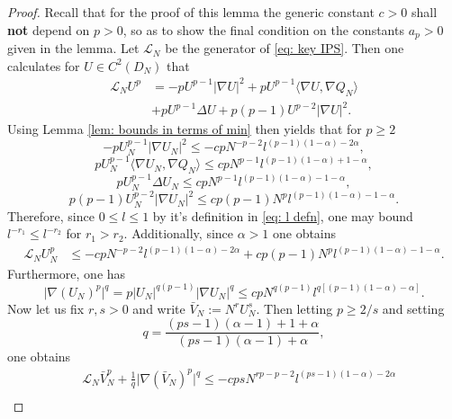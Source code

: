 \documentclass{article}
\begin{document}
\begin{proof}
Recall that for the proof of this lemma the generic constant $c>0$ shall \textbf{not} depend on $p>0$, so as to show the final condition on the constants $a_p>0$ given in the lemma. Let $\mathcal{L}_N$ be the generator of \eqref{eq: key IPS}. Then one calculates for $U\in C^2(D_N)$ that
\begin{align}
    \mathcal{L}_N U^p&=-pU^{p-1}\lvert \nabla U\rvert^2+pU^{p-1}\langle \nabla U, \nabla Q_N\rangle\nonumber \\
    &+ p U^{p-1}\Delta U+p(p-1)U^{p-2}\lvert \nabla U\rvert^2 .
\end{align}
Using Lemma \ref{lem: bounds in terms of min} then yields that for $p\geq 2$
\begin{equation}
 -pU_N^{p-1}\lvert \nabla U_N\rvert^2\leq  -cpN^{-p-2}l^{(p-1)(1-\alpha)-2\alpha},
\end{equation}
\begin{equation}
pU_N^{p-1}\langle \nabla U_N, \nabla Q_N\rangle\leq cpN^{p-1}l^{(p-1)(1-\alpha)+1-\alpha},
\end{equation}
\begin{equation}
    p U_N^{p-1}\Delta U_N\leq cpN^{p-1}l^{(p-1)(1-\alpha)-1-\alpha},
\end{equation}
\begin{equation}
p(p-1)U_N^{p-2}\lvert \nabla U_N\rvert^2\leq cp(p-1)N^pl^{(p-1)(1-\alpha)-1-\alpha}.
\end{equation}
Therefore, since $0\leq l\leq 1$ by it's definition in \eqref{eq: l defn}, one may bound $l^{-r_1}\leq l^{-r_2}$ for $r_1>r_2$. Additionally, since $\alpha>1$ one obtains
\begin{align}
    \mathcal{L}_N U_N^p&\leq -cpN^{-p-2}l^{(p-1)(1-\alpha)-2\alpha}+cp(p-1)N^pl^{(p-1)(1-\alpha)-1-\alpha} .
\end{align}
Furthermore, one has
\begin{equation}
    \lvert \nabla (U_N)^p\rvert^q=p\lvert U_N\rvert^{q(p-1)}\lvert \nabla U_N\rvert^q\leq cpN^{q(p-1)}l^{q[(p-1)(1-\alpha)-\alpha]}.
\end{equation}
Now let us fix $r,s>0$ and write $\bar{V}_N:=N^rU_N^s$. Then letting $p\geq 2/s$ and setting 
\begin{equation}\label{eq: q defn}
    q=\frac{(ps-1)(\alpha-1)+1+\alpha}{(ps-1)(\alpha-1)+\alpha},
\end{equation}
one obtains
\begin{align}
   & \mathcal{L}_N \bar{V}_N^p+ \frac{1}{q}\lvert \nabla (\bar{V}_N)^p\rvert^q\leq -cpsN^{rp-p-2}l^{(ps-1)(1-\alpha)-2\alpha}\nonumber \\

\end{align}
\end{proof}
\end{document}
